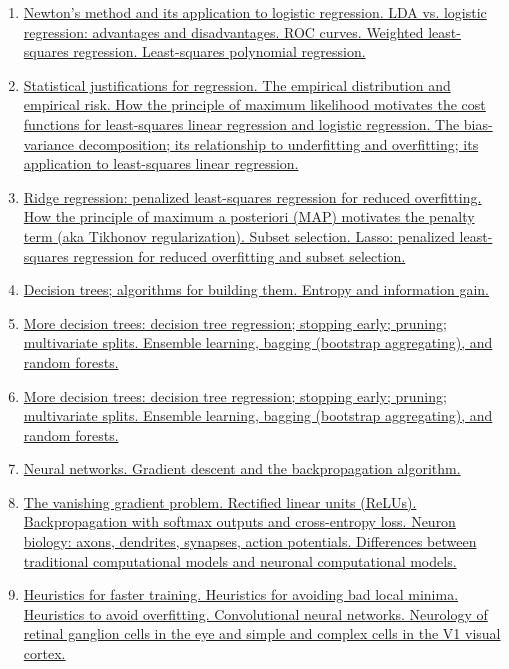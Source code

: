 \documentclass[11pt]{article}
\begin{document}
\begin{enumerate}
	\item  \href{https://mp.weixin.qq.com/s/TkOHwo93UclwmCnvE5N8HA}{Newton's method and its application to logistic regression. LDA vs. logistic regression: advantages and disadvantages. ROC curves. Weighted least-squares regression. Least-squares polynomial regression.} %
	\item  \href{https://mp.weixin.qq.com/s/PYc0w1aeE0wFCVV9qNDPTw}{Statistical justifications for regression. The empirical distribution and empirical risk. How the principle of maximum likelihood motivates the cost functions for least-squares linear regression and logistic regression. The bias-variance decomposition; its relationship to underfitting and overfitting; its application to least-squares linear regression.} %
	\item  \href{https://mp.weixin.qq.com/s/z_cQPMdVRTV_uZx4XBBdQw}{Ridge regression: penalized least-squares regression for reduced overfitting. How the principle of maximum a posteriori (MAP) motivates the penalty term (aka Tikhonov regularization). Subset selection. Lasso: penalized least-squares regression for reduced overfitting and subset selection.} %
	\item  \href{https://mp.weixin.qq.com/s/EaDBBZD-1iMa7A1OxoAiFg}{Decision trees; algorithms for building them. Entropy and information gain.} %
	\item  \href{https://mp.weixin.qq.com/s/B1dW7JklqU-R-Pld4Unc5Q}{More decision trees: decision tree regression; stopping early; pruning; multivariate splits. Ensemble learning, bagging (bootstrap aggregating), and random forests.} %
	\item  \href{https://mp.weixin.qq.com/s/mpPLcwThOWUvIr6y_9KaOw}{More decision trees: decision tree regression; stopping early; pruning; multivariate splits. Ensemble learning, bagging (bootstrap aggregating), and random forests.} %
	\item  \href{https://mp.weixin.qq.com/s/lm9wx-ttHjbzrHwfs5KTVQ}{Neural networks. Gradient descent and the backpropagation algorithm.} %
	\item  \href{https://mp.weixin.qq.com/s/zhAPyEbmTizX6mFx__b1RA}{The vanishing gradient problem. Rectified linear units (ReLUs). Backpropagation with softmax outputs and cross-entropy loss. Neuron biology: axons, dendrites, synapses, action potentials. Differences between traditional computational models and neuronal computational models.} %
	\item  \href{https://mp.weixin.qq.com/s/eawa_vyVZhCad59SNautRQ}{Heuristics for faster training. Heuristics for avoiding bad local minima. Heuristics to avoid overfitting. Convolutional neural networks. Neurology of retinal ganglion cells in the eye and simple and complex cells in the V1 visual cortex.} %

\end{enumerate}
\end{document}
